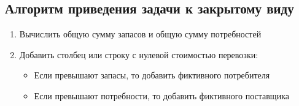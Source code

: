 \documentclass[../body.tex]{subfiles}
\begin{document}
\subsection{Алгоритм приведения задачи к закрытому виду}
\begin{enumerate}
    \item Вычислить общую сумму запасов и общую сумму потребностей
    \item Добавить столбец или строку с нулевой стоимостью перевозки:
    \begin{itemize}
        \item Если превышают запасы, то добавить фиктивного потребителя
        \item Если превышают потребности, то добавить фиктивного поставщика
    \end{itemize}
\end{enumerate}
\end{document}
